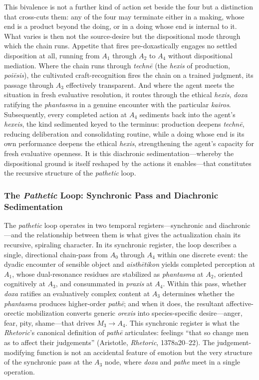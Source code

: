 \documentclass{article}
\begin{document}
This bivalence is not a further kind of action set beside the four but a distinction that cross-cuts them: any of the four may terminate either in a making, whose end is a product beyond the doing, or in a doing whose end is internal to it. What varies is then not the source-desire but the dispositional mode through which the chain runs. Appetite that fires pre-doxastically engages no settled disposition at all, running from $A_1$ through $A_2$ to $A_4$ without dispositional mediation. Where the chain runs through \textit{technē} (the \textit{hexis} of production, \textit{poiēsis}), the cultivated craft-recognition fires the chain on a trained judgment, its passage through $A_3$ effectively transparent. And where the agent meets the situation in fresh evaluative resolution, it routes through the ethical \textit{hexis}, \textit{doxa} ratifying the \textit{phantasma} in a genuine encounter with the particular \textit{kairos}. Subsequently, every completed action at $A_4$ sediments back into the agent's \textit{hexeis}, the kind sedimented keyed to the terminus: production deepens \textit{technē}, reducing deliberation and consolidating routine, while a doing whose end is its own performance deepens the ethical \textit{hexis}, strengthening the agent's capacity for fresh evaluative openness. It is this diachronic sedimentation---whereby the dispositional ground is itself reshaped by the actions it enables---that constitutes the recursive structure of the \textit{pathetic} loop.


\subsubsection*{The \textit{Pathetic} Loop: Synchronic Pass and Diachronic Sedimentation}

The \textit{pathetic} loop operates in two temporal registers---synchronic and diachronic---and the relationship between them is what gives the actualization chain its recursive, spiraling character. In its synchronic register, the loop describes a single, directional chain-pass from $A_0$ through $A_4$ within one discrete event: the dyadic encounter of sensible object and \textit{aisthētikon} yields completed perception at $A_1$, whose dual-resonance residues are stabilized as \textit{phantasma} at $A_2$, oriented cognitively at $A_3$, and consummated in \textit{praxis} at $A_4$. Within this pass, whether \textit{doxa} ratifies an evaluatively complex content at $A_3$ determines whether the \textit{phantasma} produces higher-order \textit{pathē}; and when it does, the resultant affective-orectic mobilization converts generic \textit{orexis} into species-specific desire---anger, fear, pity, shame---that drives $M_3 \rightarrow A_4$. This synchronic register is what the \textit{Rhetoric}'s canonical definition of \textit{pathē} articulates: feelings ``that so change men as to affect their judgements'' (Aristotle, \textit{Rhetoric}, 1378a20--22). The judgement-modifying function is not an accidental feature of emotion but the very structure of the synchronic pass at the $A_3$ node, where \textit{doxa} and \textit{pathe} meet in a single operation.
\end{document}
